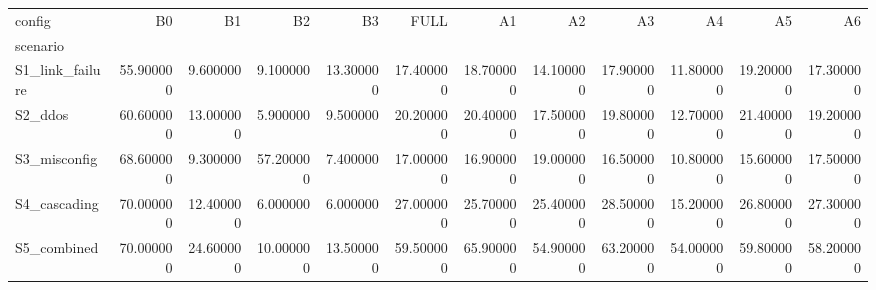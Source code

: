 \begin{tabular}{lrrrrrrrrrrr}
\toprule
config & B0 & B1 & B2 & B3 & FULL & A1 & A2 & A3 & A4 & A5 & A6 \\
scenario &  &  &  &  &  &  &  &  &  &  &  \\
\midrule
S1_link_failure & 55.900000 & 9.600000 & 9.100000 & 13.300000 & 17.400000 & 18.700000 & 14.100000 & 17.900000 & 11.800000 & 19.200000 & 17.300000 \\
S2_ddos & 60.600000 & 13.000000 & 5.900000 & 9.500000 & 20.200000 & 20.400000 & 17.500000 & 19.800000 & 12.700000 & 21.400000 & 19.200000 \\
S3_misconfig & 68.600000 & 9.300000 & 57.200000 & 7.400000 & 17.000000 & 16.900000 & 19.000000 & 16.500000 & 10.800000 & 15.600000 & 17.500000 \\
S4_cascading & 70.000000 & 12.400000 & 6.000000 & 6.000000 & 27.000000 & 25.700000 & 25.400000 & 28.500000 & 15.200000 & 26.800000 & 27.300000 \\
S5_combined & 70.000000 & 24.600000 & 10.000000 & 13.500000 & 59.500000 & 65.900000 & 54.900000 & 63.200000 & 54.000000 & 59.800000 & 58.200000 \\
\bottomrule
\end{tabular}
